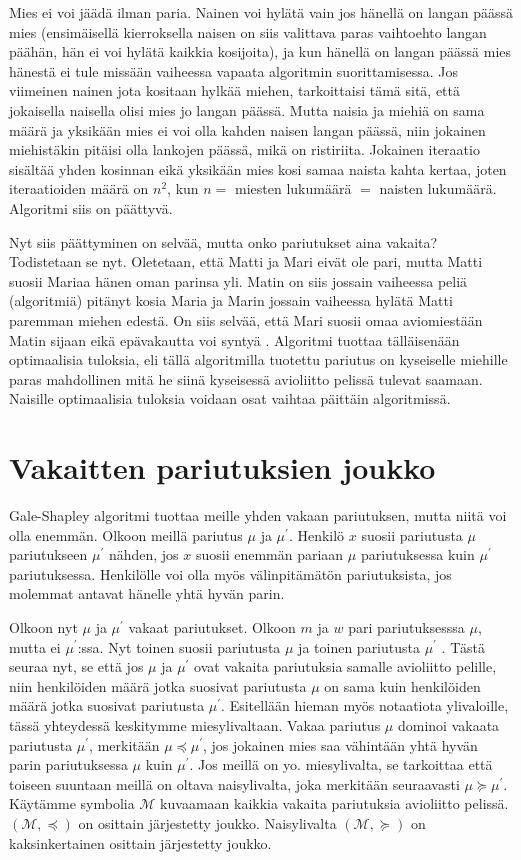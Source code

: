 \documentclass[finnish]{tktltiki2}
\theoremstyle{definition}
\theoremstyle{remark}
\begin{document}
Mies ei voi jäädä ilman paria. Nainen voi hylätä vain jos hänellä on langan päässä mies (ensimäisellä kierroksella naisen on siis valittava paras vaihtoehto langan päähän, hän ei voi hylätä kaikkia kosijoita), ja kun hänellä on langan päässä mies hänestä ei tule missään vaiheessa vapaata algoritmin suorittamisessa.
Jos viimeinen nainen jota kositaan hylkää miehen, tarkoittaisi tämä sitä, että jokaisella naisella olisi mies jo langan päässä. Mutta naisia ja miehiä on sama määrä ja yksikään mies ei voi olla kahden naisen langan päässä, niin jokainen miehistäkin pitäisi olla lankojen päässä, mikä on ristiriita.
Jokainen iteraatio sisältää yhden kosinnan eikä yksikään mies kosi samaa naista kahta kertaa, joten iteraatioiden määrä on $n^2$, kun $n = $ miesten lukumäärä $ = $ naisten lukumäärä. Algoritmi siis on päättyvä.

Nyt siis päättyminen on selvää, mutta onko pariutukset aina vakaita? Todistetaan se nyt.
Oletetaan, että Matti ja Mari eivät ole pari, mutta Matti suosii Mariaa hänen oman parinsa yli. Matin on siis jossain vaiheessa peliä (algoritmiä) pitänyt kosia Maria ja Marin jossain vaiheessa hylätä Matti paremman miehen edestä. On siis selvää, että Mari suosii omaa aviomiestään Matin sijaan eikä epävakautta voi syntyä \cite[p. 588]{gale62a}.
Algoritmi tuottaa tälläisenään optimaalisia tuloksia, eli tällä algoritmilla tuotettu pariutus on kyseiselle miehille paras mahdollinen mitä he siinä kyseisessä avioliitto pelissä tulevat saamaan.
Naisille optimaalisia tuloksia voidaan osat vaihtaa päittäin algoritmissä.

\section{Vakaitten pariutuksien joukko}
Gale-Shapley algoritmi tuottaa meille yhden vakaan pariutuksen, mutta niitä voi olla enemmän.
Olkoon meillä pariutus $\mu$ ja $\mu^{'}$. Henkilö $x$ suosii pariutusta $\mu$ pariutukseen $\mu^{'}$ nähden, jos $x$ suosii enemmän pariaan $\mu$ pariutuksessa kuin $\mu^{'}$ pariutuksessa. Henkilölle voi olla myös välinpitämätön pariutuksista, jos molemmat antavat hänelle yhtä hyvän parin.

Olkoon nyt $\mu$ ja $\mu^{'}$ vakaat pariutukset. Olkoon $m$ ja $w$ pari pariutuksesssa $\mu$, mutta ei $\mu^{'}$:ssa. Nyt toinen suosii pariutusta $\mu$ ja toinen pariutusta $\mu^{'}$ \cite[p. 18]{gusfield1989stable}.
Tästä seuraa nyt, se että jos $\mu$ ja $\mu^{'}$ ovat vakaita pariutuksia samalle avioliitto pelille, niin henkilöiden määrä jotka suosivat pariutusta $\mu$ on sama kuin henkilöiden määrä jotka suosivat pariutusta $\mu^{'}$.
Esitellään hieman myös notaatiota ylivaloille, tässä yhteydessä keskitymme miesylivaltaan.
Vakaa pariutus $\mu$ dominoi vakaata pariutusta $\mu^{'}$, merkitään $\mu \preceq \mu^{'}$, jos jokainen mies saa vähintään yhtä hyvän parin pariutuksessa $\mu$ kuin $\mu^{'}$.
Jos meillä on yo. miesylivalta, se tarkoittaa että toiseen suuntaan meillä on oltava naisylivalta, joka merkitään seuraavasti $\mu \succeq \mu^{'}$. Käytämme symbolia $\mathcal{M}$ kuvaamaan kaikkia vakaita pariutuksia avioliitto pelissä. $(\mathcal{M}, \preceq)$ on osittain järjestetty joukko. Naisylivalta $(\mathcal{M}, \succeq)$ on kaksinkertainen osittain järjestetty joukko.
\end{document}
